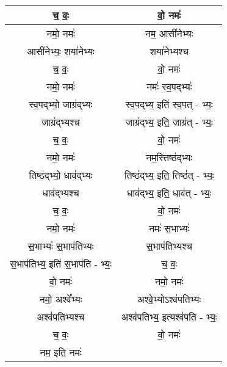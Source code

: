 {\begin{longtable}{|c|c|}
\hline
च॒ वः॒                       & वो॒ नमः॑ \\
\hline
नमो॒ नमः॑                    & नम॒ आसी॑नेभ्यः \\
\hline
आसी॑नेभ्यः॒ शया॑नेभ्यः            & शया॑नेभ्यश्च \\
\hline
च॒ वः॒                       & वो॒ नमः॑ \\
\hline
नमो॒ नमः॑                    & नमः॑ स्व॒पद्भ्यः॑ \\
\hline
स्व॒पद्भ्यो॒ जाग्र॑द्भ्यः           & स्व॒पद्भ्य॒ इति॑ स्व॒पत् - भ्यः॒ \\
\hline
जाग्र॑द्भ्यश्च                  & जाग्र॑द्भ्य॒ इति॒ जाग्र॑त् - भ्यः॒ \\
\hline
च॒ वः॒                       & वो॒ नमः॑ \\
\hline
नमो॒ नमः॑                    & नम॒स्तिष्ठ॑द्भ्यः \\
\hline
तिष्ठ॑द्भ्यो॒ धाव॑द्भ्यः           & तिष्ठ॑द्भ्य॒ इति॒ तिष्ठ॑त् - भ्यः॒ \\
\hline
धाव॑द्भ्यश्च                   & धाव॑द्भ्य॒ इति॒ धाव॑त् - भ्यः॒ \\
\hline
च॒ वः॒                       & वो॒ नमः॑ \\
\hline
नमो॒ नमः॑                    & नमः॑ स॒भाभ्यः॑ \\
\hline
स॒भाभ्यः॑ स॒भाप॑तिभ्यः           & स॒भाप॑तिभ्यश्च \\
\hline
स॒भाप॑तिभ्य॒ इति॑ स॒भाप॑ति - भ्यः॒  & च॒ वः॒ \\
\hline
वो॒ नमः॑                     & नमो॒ नमः॑ \\
\hline
नमो॒ अश्वे᳚भ्यः                 & अश्वे॒भ्योऽश्व॑पतिभ्यः \\
\hline
अश्व॑पतिभ्यश्च                 & अश्व॑पतिभ्य॒ इत्यश्व॑पति - भ्यः॒ \\
\hline
च॒ वः॒                       & वो॒ नमः॑ \\
\hline
नम॒ इति॒ नमः॑                 & \\
\hline
\end{longtable}
}
